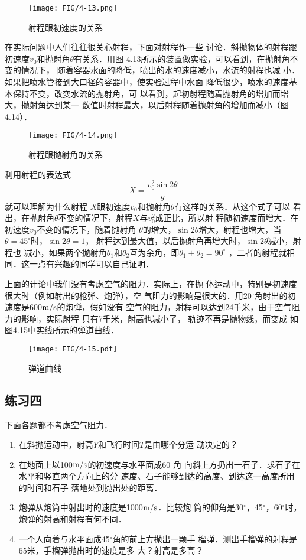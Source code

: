 \begin{figure}[htp]
    \centering
    \texttt{[image: FIG/4-13.png]}
    \caption{射程跟初速度的关系}
    \end{figure}

    在实际问题中人们往往很关心射程，下面对射程作一些
讨论．斜抛物体的射程跟初速度$v_0$和抛射角$\theta$有关系．用图
4.13所示的装置做实验，可以看到，在抛射角不变的情况下，
随着容器水面的降低，喷出的水的速度减小，水流的射程也减
小．如果把喷水管接到大口径的容器中，使实验过程中水面
降低很少，喷水的速度基本保持不变，改变水流的抛射角，可
以看到，起初射程随着抛射角的增加而增大，抛射角达到某一
数值时射程最大，以后射程随着抛射角的增加而减小（图4.14）．

\begin{figure}[htp]
    \centering
    \texttt{[image: FIG/4-14.png]}
    \caption{射程跟抛射角的关系}
    \end{figure}

利用射程的表达式
\[X=\frac{v_0^2\sin 2\theta}{g} \]
就可以理解为什么射程
$X$跟初速度$v_0$和抛射角$\theta$有这样的关系．从这个式子可以
看出，在抛射角$\theta$不变的情况下，射程$X$与$v^2_0$成正比，所以射
程随初速度而增大．在初速度$v_0$不变的情况下，随着抛射角
$\theta$的增大，$\sin 2\theta$增大，射程也增大，当$\theta=45^{\circ}$时，$\sin 2\theta=1$，
射程达到最大值，以后抛射角再增大时，$\sin 2\theta$减小，射程也
减小，如果两个抛射角$\theta_1$和$\theta_2$互为余角，即$\theta_1+\theta_2=90^\circ$
，二者的射程就相同．这一点有兴趣的同学可以自己证明．

    上面的计论中我们没有考虑空气的阻力．实际上，在抛
体运动中，特别是初速度很大时（例如射出的枪弹、炮弹），空
气阻力的影响是很大的．用20$^\circ$角射出的初速度是600$\text{m}/\text{s}$的炮弹，假如没有 空气的阻力，射程可以达到24千米，由于空气阻力的影响，实际射程
只有7千米，射高也减小了，
轨迹不再是抛物线，而变成
如图4.15中实线所示的弹道曲线．

\begin{figure}[htp]
    \centering
    \texttt{[image: FIG/4-15.pdf]}
    \caption{弹道曲线}
    \end{figure}

\subsection*{练习四}
    下面各题都不考虑空气阻力．
\begin{enumerate}
 \item 在斜抛运动中，射高$Y$和飞行时间$T$是由哪个分运
动决定的？
 \item 在地面上以100$\text{m}/\text{s}$的初速度与水平面成60$^\circ$角
向斜上方扔出一石子．求石子在水平和竖直两个方向上的分
速度、石子能够到达的高度、到达这一高度所用的时间和石子
落地处到抛出处的距离．
  \item 炮弹从炮筒中射出时的速度是1000$\text{m}/\text{s}$．比较炮
筒的仰角是30$^\circ$，45$^\circ$，60$^\circ$时，炮弹的射高和射程有何不同．
  \item 一个人向着与水平面成45$^\circ$角的前上方抛出一颗手
榴弹．测出手榴弹的射程是65米，手榴弹抛出时的速度是多
大？射高是多高？
\end{enumerate}

